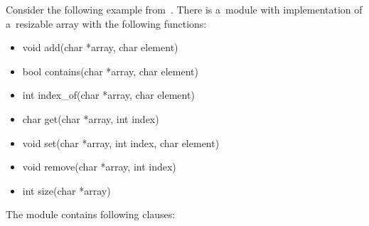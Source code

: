 Consider the following example from~\cite{contracts2017}. There is
a~module with implementation of a~resizable array with the following
functions:
\begin{itemize}[label=]
    \tt

    \item void add(char *array, char element)
    \item bool contains(char *array, char element)
    \item int index\_of(char *array, char element)
    \item char get(char *array, int index)
    \item void set(char *array, int index, char element)
    \item void remove(char *array, int index)
    \item int size(char *array)
\end{itemize}
The module contains following clauses:

